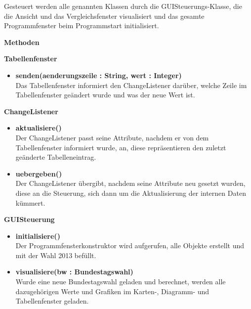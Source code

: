 \documentclass[12pt,a4paper,titlepage]{article}
\begin{document}
Gesteuert werden alle genannten Klassen durch die GUISteuerungs-Klasse, die die Ansicht und das
Vergleichsfenster visualisiert und das gesamte Programmfenster beim Programmstart initialisiert.
\newline
\newline
\begin{Large}
\textbf{Methoden}
\end{Large}
\begin{description}
\item \textbf {Tabellenfenster} \\
\begin{itemize}
\item \textbf {senden(aenderungszeile : String, wert : Integer)} \\
Das Tabellenfenster informiert den ChangeListener darüber, welche Zeile im Tabellenfenster
geändert  wurde und was der neue Wert ist. \\
\end{itemize}
\item \textbf {ChangeListener} \\
\begin{itemize}
\item \textbf {aktualisiere()} \\
Der ChangeListener passt seine Attribute, nachdem er von dem Tabellenfenster informiert wurde, an,
diese repräsentieren den zuletzt geänderte Tabelleneintrag. \\
\item \textbf {uebergeben()} \\
Der ChangeListener übergibt, nachdem seine Attribute neu gesetzt wurden, diese an die Steuerung,
sich dann um die Aktualisierung der internen Daten kümmert. \\
\end{itemize} 
\item \textbf {GUISteuerung} \\
\begin{itemize}
\item \textbf {initialisiere()} \\
Der Programmfensterkonstruktor wird aufgerufen, alle Objekte erstellt und mit der Wahl 2013 befüllt. \\
\item \textbf {visualisiere(bw : Bundestagswahl)} \\
Wurde eine neue Bundestagswahl geladen und berechnet, werden alle dazugehörigen Werte und Grafiken
im Karten-, Diagramm- und Tabellenfenster geladen. \\ 

\end{itemize}
\end{description}
\end{document}
